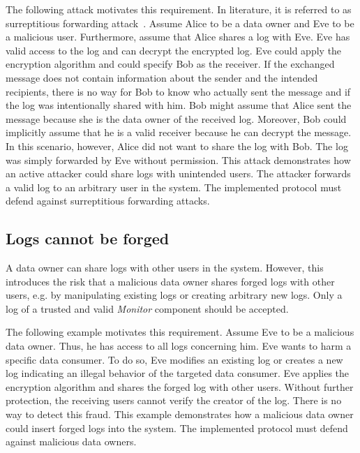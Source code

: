 \documentclass[../main.tex]{subfiles}
\begin{document}
The following attack motivates this requirement.
In literature, it is referred to as surreptitious forwarding attack~\cite{Davis2001}.
Assume Alice to be a data owner and Eve to be a malicious user.
Furthermore, assume that Alice shares a log with Eve.
Eve has valid access to the log and can decrypt the encrypted log.
Eve could apply the encryption algorithm and could specify Bob as the receiver.
If the exchanged message does not contain information about the sender and the intended recipients, there is no way for Bob to know who actually sent the message and if the log was intentionally shared with him.
Bob might assume that Alice sent the message because she is the data owner of the received log.
Moreover, Bob could implicitly assume that he is a valid receiver because he can decrypt the message.
In this scenario, however, Alice did not want to share the log with Bob.
The log was simply forwarded by Eve without permission.
This attack demonstrates how an active attacker could share logs with unintended users.
The attacker forwards a valid log to an arbitrary user in the system.
The implemented protocol must defend against surreptitious forwarding attacks.

\subsection{Logs cannot be forged}

A data owner can share logs with other users in the system.
However, this introduces the risk that a malicious data owner shares forged logs with other users, e.g. by manipulating existing logs or creating arbitrary new logs.
Only a log of a trusted and valid \emph{Monitor} component should be accepted.

The following example motivates this requirement.
Assume Eve to be a malicious data owner.
Thus, he has access to all logs concerning him.
Eve wants to harm a specific data consumer.
To do so, Eve modifies an existing log or creates a new log indicating an illegal behavior of the targeted data consumer.
Eve applies the encryption algorithm and shares the forged log with other users.
Without further protection, the receiving users cannot verify the creator of the log.
There is no way to detect this fraud.
This example demonstrates how a malicious data owner could insert forged logs into the system.
The implemented protocol must defend against malicious data owners.
\end{document}
